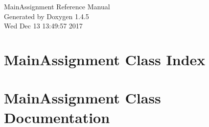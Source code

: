 \documentclass[a4paper]{book}
\begin{document}
\begin{titlepage}
\vspace*{7cm}
\begin{center}
{\Large Main\-Assignment Reference Manual}\\
\vspace*{1cm}
{\large Generated by Doxygen 1.4.5}\\
\vspace*{0.5cm}
{\small Wed Dec 13 13:49:57 2017}\\
\end{center}
\end{titlepage}
\clearemptydoublepage
{}
\tableofcontents
\clearemptydoublepage
{}
\chapter{Main\-Assignment Class Index}

\chapter{Main\-Assignment Class Documentation}






\printindex
\end{document}

